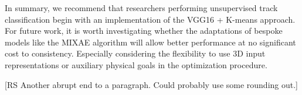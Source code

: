 \documentclass[review,number,sort&compress]{elsarticle}
\begin{document}


In summary, we recommend that researchers performing unsupervised track classification begin with an implementation of the VGG16 + K-means approach. For future work, it is worth investigating whether the adaptations of bespoke models like the MIXAE algorithm will allow better performance at no significant cost to consistency.  Especially considering the flexibility to use 3D input representations or auxiliary physical goals in the optimization procedure. 


{\color{orange}[RS Another abrupt end to a paragraph. Could probably use some rounding out.]} 

\appendix  
\end{document}
